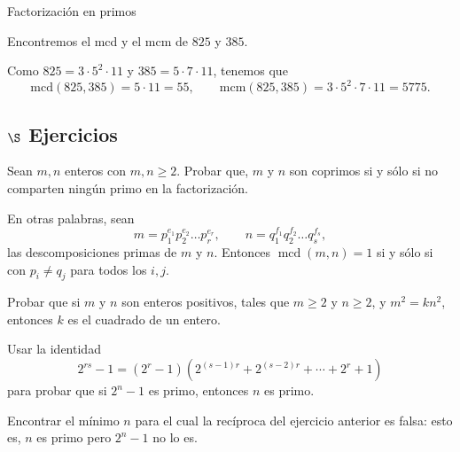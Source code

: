 \begin{section}{Factorización en primos}
\begin{ejemplo*}
Encontremos el mcd y el mcm  de $825$ y $385$.

Como $825 =  3\cdot 5^2\cdot 11$ y $385 = 5\cdot 7\cdot 11$, tenemos que
$$
\text{mcd}(825,385) = 5\cdot 11 = 55, \qquad \text{mcm}(825,385) = 3\cdot 5^2\cdot 7\cdot 11 = 5775.
$$
\end{ejemplo*}



\subsection*{$\S$ Ejercicios}

\begin{enumex}
    \item Sean $m,n$ enteros con $m,n\ge 2$. Probar que,  $m$ y  $n$ son coprimos si y sólo si no comparten ningún primo en la factorización. 
    
    En otras palabras, sean  
    $$
    m=p_1^{e_1}p_2^{e_2}\ldots p_r^{e_r},\qquad
    n=q_1^{f_1}q_2^{f_2}\ldots q_s^{f_s},
    $$ 
    las descomposiciones primas de $m$ y $n$. Entonces  $\operatorname{mcd}(m,n) =1$ si y sólo si con $p_i \not= q_j$ para todos los $i,j$.  
    
\item Probar que si $m$ y $n$ son enteros positivos, tales que $m\ge 2$ y $n \ge 2$, y
$m^2 = kn^2$, entonces $k$ es el cuadrado de un entero.

\item Usar la identidad
$$
2^{rs} -1 = (2^r-1) (2^{(s-1)r}+2^{(s-2)r}+\cdots +2^r+1)
$$
para probar que si $2^n-1$ es primo, entonces $n$ es primo.

\item Encontrar el mínimo $n$ para el cual la recíproca del ejercicio anterior
es falsa: esto es, $n$ es primo pero $2^n-1$ no lo es.
\end{enumex}

\end{section}    
    

